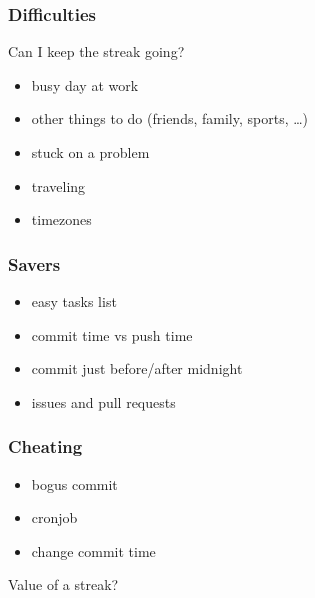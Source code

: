 \documentclass[14pt]{beamer}
\begin{document}
  \begin{frame}
    \frametitle{Difficulties}
    Can I keep the streak going?
    \begin{itemize}
      \item busy day at work
      \item other things to do (friends, family, sports, \ldots)
      \item stuck on a problem
      \item traveling
      \item timezones
    \end{itemize}
  \end{frame}
  \begin{frame}
    \frametitle{Savers}
    \begin{itemize}
      \item easy tasks list
      \item commit time vs push time
      \item commit just before/after midnight
      \item issues and pull requests
    \end{itemize}
  \end{frame}
  \begin{frame}
    \frametitle{Cheating}
    \begin{itemize}
      \item bogus commit
      \item cronjob
      \item change commit time
    \end{itemize}
    Value of a streak?
  \end{frame}
\end{document}
